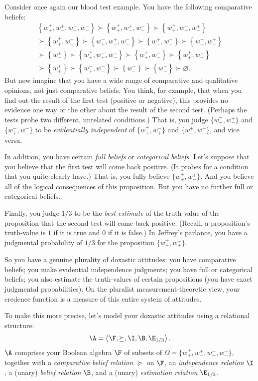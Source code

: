 Consider once again our blood test example. You have the following comparative beliefs:
\begin{gather*}
\left\{w^+_+,w^+_-,w^-_+,w^-_-\right\}\succ\left\{w^+_+,w^+_-,w^-_-\right\}\succ\left\{w^+_+,w^-_+,w^+_-\right\}\\
\succ\left\{w^+_+,w^+_-\right\}\succ\left\{w^-_+,w^+_-,w^-_-\right\}\succ\left\{w^+_-,w^-_-\right\}\succ\left\{w^-_+,w^+_-\right\}\\
\succ\left\{w^+_-\right\}\succ\left\{w^+_+,w^-_+,w^-_-\right\}\succ\left\{w^+_+,w^-_-\right\}\succ\left\{w^+_+,w^-_+\right\}\\
\succ\left\{w^+_+\right\}\succ\left\{w^-_+,w^-_-\right\}\succ\left\{w^-_-\right\}\succ\left\{w^-_+\right\}\succ\varnothing.
\end{gather*}
But now imagine that you have a wide range of comparative and qualitative opinions, not just comparative beliefs. You think, for example, that when you find out the result of the first test (positive or negative), this provides no evidence one way or the other about the result of the second test. (Perhaps the tests probe two different, unrelated conditions.) That is, you judge $\{w^+_+,w^+_-\}$ and $\{w^-_+,w^-_-\}$ to be \emph{evidentially independent} of $\{w^+_+,w^-_+\}$ and $\{w^+_-,w^-_-\}$, and vice versa.

In addition, you have certain \emph{full beliefs} or \emph{categorical beliefs}. Let's suppose that you believe that the first test will come back positive. (It probes for a condition that you quite clearly have.) That is, you fully believe $\{w^+_+,w^+_-\}$. And you believe all of the logical consequences of this proposition. But you have no further full or categorical beliefs.

Finally, you judge $1/3$ to be the \emph{best estimate} of the truth-value of the proposition that the second test will come back positive. (Recall, a proposition's truth-value is $1$ if it is true and $0$ if it is false.) In Jeffrey's parlance, you have a judgmental probability of $1/3$ for the proposition $\{w^+_+,w^-_+\}$.

So you have a genuine plurality of doxastic attitudes: you have comparative beliefs; you make evidential independence judgments; you have full or categorical beliefs; you also estimate the truth-values of certain propositions (you have exact judgmental probabilities). On the pluralist measurement-theoretic view, your credence function is a measure of this entire system of attitudes.

To make this more precise, let's model your doxastic attitudes using a relational structure:
$$ \A=\left<\F,\succeq,\I,\B,\E_{1/3}\right>. $$
$\A$ comprises your Boolean algebra $\F$ of subsets of $\Omega=\{w^+_+,w^+_-,w^-_+,w^-_-\}$, together with a \textit{comparative belief relation} $\succeq$ on $\F$, an \textit{independence relation} $\I$, a (unary) \textit{belief relation} $\B$, and a (unary) \textit{estimation relation} $\E_{1/3}$. 


